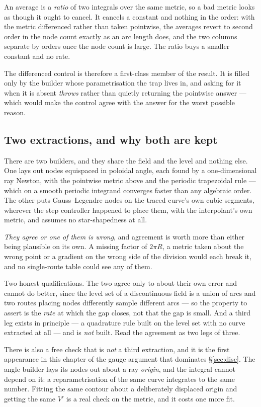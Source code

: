 An average is a \emph{ratio} of two integrals over the same metric, so a bad
metric looks as though it ought to cancel. It cancels a constant and nothing in
the order: with the metric differenced rather than taken pointwise, the averages
revert to second order in the node count exactly as an arc length does, and the
two columns separate by orders once the node count is large. The ratio buys a
smaller constant and no rate.

The differenced control is therefore a first-class member of the result. It is
filled only by the builder whose parametrisation the trap lives in, and asking
for it when it is absent \emph{throws} rather than quietly returning the
pointwise answer --- which would make the control agree with the answer for the
worst possible reason.

\subsection{Two extractions, and why both are kept}

There are two builders, and they share the field and the level and nothing else.
One lays out nodes equispaced in poloidal angle, each found by a
one-dimensional ray Newton, with the pointwise metric above and the periodic
trapezoidal rule \cite{TrefethenWeideman2014} --- which on a smooth periodic
integrand converges faster than any algebraic order. The other puts
Gauss--Legendre nodes on the traced curve's own cubic segments, wherever the step
controller happened to place them, with the interpolant's own metric, and assumes
no star-shapedness at all.

\emph{They agree or one of them is wrong}, and agreement is worth more than
either being plausible on its own. A missing factor of $2\pi R$, a metric taken
about the wrong point or a gradient on the wrong side of the division would each
break it, and no single-route table could see any of them.

Two honest qualifications. The two agree only to about their own error and cannot
do better, since the level set of a discontinuous field is a union of arcs and
two routes placing nodes differently sample different arcs --- so the property to
assert is the \emph{rate} at which the gap closes, not that the gap is small. And
a third leg exists in principle --- a quadrature rule built on the level set with
no curve extracted at all --- and is \emph{not} built. Read the agreement as two
legs of three.

There is also a free check that is \emph{not} a third extraction, and it is the
first appearance in this chapter of the gauge argument that dominates
\S\ref{sec:disc}. The angle builder lays its nodes out about a ray \emph{origin},
and the integral cannot depend on it: a reparametrisation of the same curve
integrates to the same number. Fitting the same contour about a deliberately
displaced origin and getting the same $V'$ is a real check on the metric, and it
costs one more fit.

